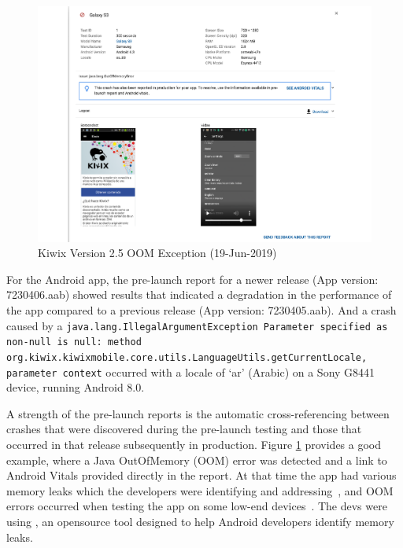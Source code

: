 \begin{figure}
    \centering
    \includegraphics[width=\linewidth]{images/google-play-console/Pre-launch_report_Galaxy_S3_OOM_Exception_Details_(19-Jun-2019).pdf}
    \caption{Kiwix Version 2.5 OOM Exception (19-Jun-2019)}
    \label{fig:pre-launch-report-kiwix-oom-also-in-production}
\end{figure}

For the  Android app, the pre-launch report for a newer release (App version: 7230406.aab) showed results that indicated a degradation in the performance of the app compared to a previous release (App version: 7230405.aab). And a crash caused by a \texttt{java.lang.IllegalArgumentException Parameter specified as non-null is null: method org.kiwix.kiwixmobile.core.utils.LanguageUtils.getCurrentLocale, parameter context} occurred with a locale of `ar' (Arabic) on a Sony G8441 device, running Android 8.0.

A strength of the pre-launch reports is the automatic cross-referencing between crashes that were discovered during the pre-launch testing and those that occurred in that release subsequently in production. Figure \ref{fig:pre-launch-report-kiwix-oom-also-in-production} provides a good example, where a Java OutOfMemory (OOM) error was detected and a link to Android Vitals provided directly in the report. At that time the app had various memory leaks which the developers were identifying and addressing~, and OOM errors occurred when testing the app on some low-end devices~. The devs were using , an opensource tool designed to help Android developers identify memory leaks. 

